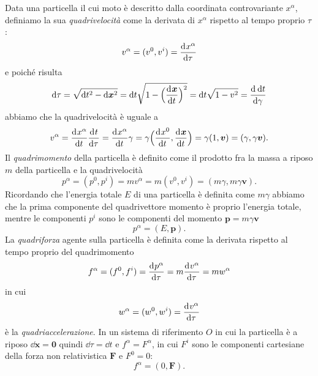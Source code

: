 Data una particella il cui moto è descritto dalla coordinata controvariante
$x^{\alpha}$, definiamo la sua \emph{quadrivelocità} come
la derivata di $x^{\alpha}$ rispetto al tempo proprio $\tau$:
\begin{equation}
  v^{\alpha} = (v^{0}, v^{i}) =\frac{{\mathop{}\!\mathrm{d}^{}}x^{\alpha}}{\mathop{}\!\mathrm{d} {\tau}^{}}
\end{equation}
e poiché risulta
\begin{equation}
  \dd \tau = \sqrt{\dd t^{2} - \dd \bm{x}^{2}} = \dd t \sqrt{1 -
    \Big(\toder{\bm{x}}{t}\Big)^{2}} = \dd t\sqrt{1 - v^{2}} = \toder{\dd
    t}{\gamma}
\end{equation}
abbiamo che la quadrivelocità è uguale a
\begin{equation}
  v^{\alpha} = \toder{x^{\alpha}}{t}\toder{t}{\tau} = \toder{x^{\alpha}}{t}
  \gamma = \gamma \Big(\toder{x^{0}}{t}, \toder{\bm{x}}{t}\Big) =
  \gamma(1,\bm{v}) = (\gamma, \gamma\bm{v}).
\end{equation}
Il \emph{quadrimomento} della particella è definito come il
prodotto fra la massa a riposo $m$ della particella e la quadrivelocità
\begin{equation}
  p^{\alpha} = (p^{0},p^{i}) = m v^{\alpha} = m (v^{0}, v^{i}) = (m\gamma,
  m\gamma\bm{v}).
\end{equation}
Ricordando che l'energia totale $E$ di una particella è definita come $m\gamma$
abbiamo che la prima componente del quadrivettore momento è proprio l'energia
totale, mentre le componenti $p^{i}$ sono le componenti del momento
$\bm{p} = m\gamma\bm{v}$
\begin{equation}
  p^{\alpha} = (E, \bm{p}).
\end{equation}
La \emph{quadriforza} agente sulla particella è definita come
la derivata rispetto al tempo proprio del quadrimomento
\begin{equation}
  f^{\alpha} = (f^{0},f^{i}) =\frac{{\mathop{}\!\mathrm{d}^{}}p^{\alpha}}{\mathop{}\!\mathrm{d} {\tau}^{}} =
  m\frac{{\mathop{}\!\mathrm{d}^{}}v^{\alpha}}{\mathop{}\!\mathrm{d} {\tau}^{}} = mw^{\alpha}
\end{equation}
in cui
\begin{equation}
  w^{\alpha} = (w^{0},w^{i}) =\frac{{\mathop{}\!\mathrm{d}^{}}v^{\alpha}}{\mathop{}\!\mathrm{d} {\tau}^{}}
\end{equation}
è la \emph{quadriaccelerazione}.  In un sistema di
riferimento $O$ in cui la particella è a riposo $\dd \bm{x} = \bm{0}$ quindi
$\dd \tau = \dd t$ e $f^{\alpha} = F^{\alpha}$, in cui $F^{i}$ sono le
componenti cartesiane della forza non relativistica $\bm{F}$ e $F^{0} = 0$:
\begin{equation}
  f^{\alpha} = (0, \bm{F}).
\end{equation}

